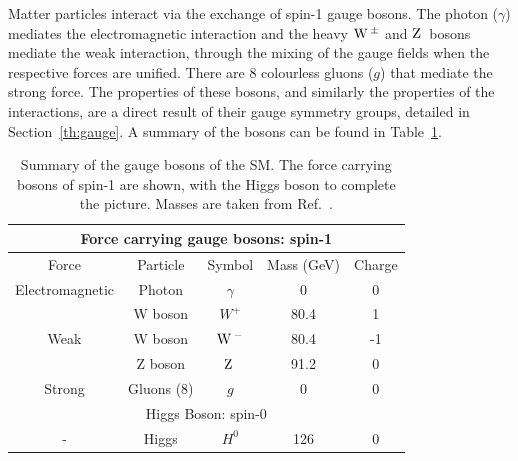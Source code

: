 Matter particles interact via the exchange of spin-1 gauge bosons. 
The photon ($\gamma$) mediates the electromagnetic interaction and the heavy $\mathrm{W}\,^{\pm}$ and $\mathrm{Z}\,$ bosons mediate the weak interaction, through the mixing of the gauge fields when the respective forces are unified. There are 8 colourless gluons ($g$) that mediate the strong force.
The properties of these bosons, and similarly the properties of the interactions, are a direct result of their gauge symmetry groups, detailed in Section~\ref{th:gauge}.
A summary of the bosons can be found in Table~\ref{tab:SMbosons}.
%
%
%

\begin{table}
\begin{tabular}[ht!]{c|cccc}	
\hline
\multicolumn{5}{c}{Force carrying gauge bosons: spin-1} \\ \hline
Force & Particle & Symbol & Mass (GeV) & Charge \\ \hline
Electromagnetic & Photon & $\gamma$ & 0 & 0 \\ 
\multirow{3}{*}{Weak} & W boson & $W^{+}$ & 80.4 & 1 \\
& W boson & $\mathrm{W}\,^{-}$ & 80.4 & -1 \\
& Z boson & $\mathrm{Z}\,$ & 91.2 & 0 \\
Strong & Gluons (8) & $g$ & 0 & 0 \\ \hline
\multicolumn{5}{c}{Higgs Boson: spin-0} \\ \hline
- & Higgs & $H^{0}$ & 126 & 0 \\ \hline
\end{tabular}
\caption{\label{tab:SMbosons}Summary of the gauge bosons of the \ac{SM}. The force carrying bosons of spin-1 are shown, with the Higgs boson to complete the picture. Masses are taken from Ref.~\cite{PDG}.}

\end{table}


